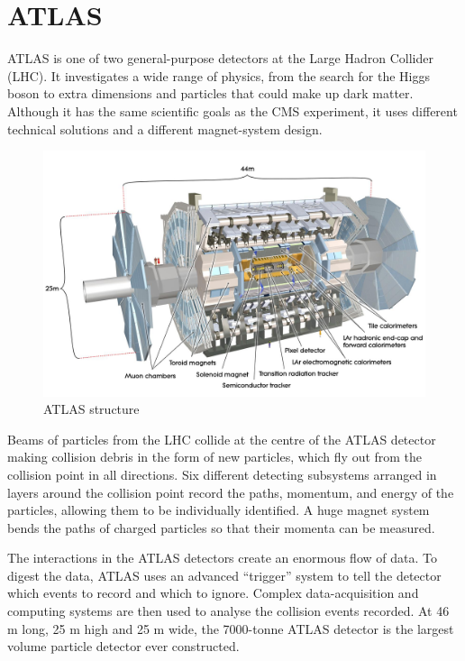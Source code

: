 \documentclass[a4paper, oneside]{book}
\begin{document}
		\section{ATLAS}	
		\cite{ATLAS intro}ATLAS is one of two general-purpose detectors at the Large Hadron Collider (LHC). It investigates a wide range of physics, from the search for the Higgs boson to extra dimensions and particles that could make up dark matter. Although it has the same scientific goals as the CMS experiment, it uses different technical solutions and a different magnet-system design.
		
		\begin{figure}
			\centering
			\includegraphics[width=0.45\textheight]{tesi_images/atlas_structure.jpg}
			\caption{ATLAS structure}
		\end{figure}
		
		Beams of particles from the LHC collide at the centre of the ATLAS detector making collision debris in the form of new particles, which fly out from the collision point in all directions. Six different detecting subsystems arranged in layers around the collision point record the paths, momentum, and energy of the particles, allowing them to be individually identified. A huge magnet system bends the paths of charged particles so that their momenta can be measured.
		
		The interactions in the ATLAS detectors create an enormous flow of data. To digest the data, ATLAS uses an advanced “trigger” system to tell the detector which events to record and which to ignore. Complex data-acquisition and computing systems are then used to analyse the collision events recorded. At 46 m long, 25 m high and 25 m wide, the 7000-tonne ATLAS detector is the largest volume particle detector ever constructed. 
\end{document}
